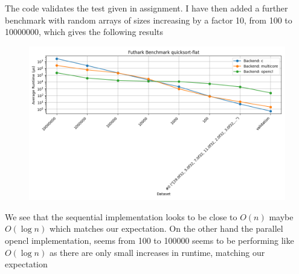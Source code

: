 \documentclass[a4paper,12pt]{article}
\begin{document}
The code validates the test given in assignment. I have then added a
further benchmark with random arrays of sizes increasing by a factor 10,
from 100 to 10000000, which gives the following results
\begin{figure}[htb!]
  \centering
  \includegraphics[width=\linewidth]{quicksort-flatbenchmark_results.png}
\end{figure}
We see that the sequential implementation looks to be close to \(O(n)\)
maybe \(O(\log n)\) which matches our expectation.
On the other hand the parallel opencl implementation, seems from 100 to
100000 seems to be performing like \(O(\log n)\) as there are only small
       increases in runtime, matching our expectation
\end{document}
